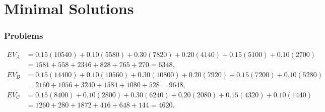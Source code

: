 \part{Minimal Solutions}

\section*{Problems}
\[\begin{aligned}
		EV_A &= 0.15(10540)+0.10(5580)+0.30(7820)+0.20(4140)+0.15(5100)+0.10(2700)\\
		&= 1581+558+2346+828+765+270=6348,\\
		EV_B &= 0.15(14400)+0.10(10560)+0.30(10800)+0.20(7920)+0.15(7200)+0.10(5280)\\
		&= 2160+1056+3240+1584+1080+528=9648,\\
		EV_C &= 0.15(8400)+0.10(2800)+0.30(6240)+0.20(2080)+0.15(4320)+0.10(1440)\\
		&= 1260+280+1872+416+648+144=4620.
		\end{aligned}\]


